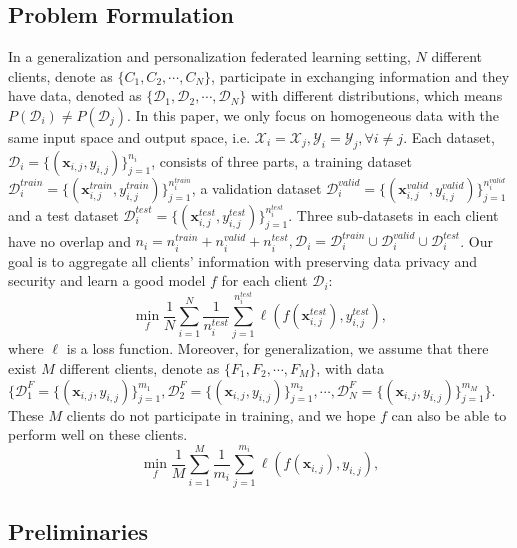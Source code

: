 \documentclass[11pt]{article}
\begin{document}
\subsection{Problem Formulation}
In a generalization and personalization federated learning setting, $N$ different clients, denote as $\{C_1, C_2, \cdots, C_N\}$, participate in exchanging information and they have data, denoted as $\{ \mathcal{D}_1, \mathcal{D}_2, \cdots, \mathcal{D}_N \}$ with different distributions, which means $P(\mathcal{D}_i) \neq P(\mathcal{D}_j)$. 
In this paper, we only focus on homogeneous data with the same input space and output space, i.e. $\mathcal{X}_i = \mathcal{X}_j, \mathcal{Y}_i = \mathcal{Y}_j, \forall i\neq j$.
Each dataset, $\mathcal{D}_i = \{ (\mathbf{x}_{i,j}, y_{i,j}) \}_{j=1}^{n_i}$, consists of three parts, a training dataset $\mathcal{D}_i^{train} = \{ (\mathbf{x}_{i,j}^{train}, y_{i,j}^{train}) \}_{j=1}^{n_i^{train}}$, a validation dataset $\mathcal{D}_i^{valid} = \{ (\mathbf{x}_{i,j}^{valid}, y_{i,j}^{valid}) \}_{j=1}^{n_i^{valid}}$ and a test dataset $\mathcal{D}_i^{test} = \{ (\mathbf{x}_{i,j}^{test}, y_{i,j}^{test}) \}_{j=1}^{n_i^{test}}$. 
Three sub-datasets in each client have no overlap and $n_i = n_i^{train} + n_i^{valid} + n_i^{test}, \mathcal{D}_i = \mathcal{D}_i^{train} \cup \mathcal{D}_i^{valid} \cup \mathcal{D}_i^{test}$.
Our goal is to aggregate all clients' information with preserving data privacy and security and learn a good model $f$ for each client $\mathcal{D}_i$:
\begin{equation}
    \min_{f} \frac{1}{N} \sum_{i=1}^N \frac{1}{n_{i}^{test}} \sum_{j=1}^{n_i^{test}} \ell(f(\mathbf{x}_{i,j}^{test}), y_{i,j}^{test}),
    \label{eqa:goal1}
\end{equation}
where $\ell$ is a loss function.
Moreover, for generalization, we assume that there exist $M$ different clients, denote as $\{F_1, F_2, \cdots, F_M\}$, with data $\{ \mathcal{D}_1^F =\{ (\mathbf{x}_{i,j}, y_{i,j}) \}_{j=1}^{m_1},  \mathcal{D}_2^F= \{ (\mathbf{x}_{i,j}, y_{i,j}) \}_{j=1}^{m_2}, \cdots, \mathcal{D}_N^F=\{ (\mathbf{x}_{i,j}, y_{i,j}) \}_{j=1}^{m_M} \}$.
These $M$ clients do not participate in training, and we hope $f$ can also be able to perform well on these clients.
\begin{equation}
    \min_{f} \frac{1}{M} \sum_{i=1}^M \frac{1}{m_{i}} \sum_{j=1}^{m_i} \ell(f(\mathbf{x}_{i,j}), y_{i,j}),
    \label{eqa:goal2}
\end{equation}

\subsection{Preliminaries}
\end{document}
